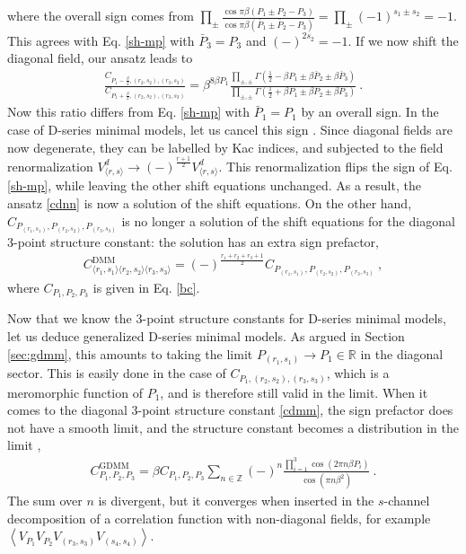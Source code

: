 \documentclass[12pt, a4paper]{article}
\theoremstyle{break}
\begin{document}
where the overall sign comes from $\prod_\pm \frac{\cos \pi\beta(P_1\pm P_2-P_3)}{\cos\pi\beta(\bar P_1\pm \bar P_2-P_3)} = \prod_\pm (-1)^{s_1\pm s_2} = -1$. This agrees with Eq. \eqref{sh-mp} with $\bar P_3=P_3$ and $(-)^{2s_2}=-1$. If we now shift the diagonal field, our ansatz leads to 
\begin{align}
 \frac{C_{P_1-\frac{\beta}{2},(r_2,s_2),(r_3,s_3)}}{C_{P_1+\frac{\beta}{2},(r_2,s_2),(r_3,s_3)}} =\beta^{8\beta P_1}\frac{\prod_{\pm,\pm} \Gamma(\frac12-\beta P_1\pm \beta\bar P_2\pm \beta \bar P_3)}{\prod_{\pm,\pm} \Gamma(\frac12+\beta P_1\pm \beta P_2\pm \beta P_3)}\ .
\end{align}
Now this ratio differs from Eq. \eqref{sh-mp} with $\bar P_1=P_1$ by an overall sign. 
In the case of D-series minimal models, 
let us cancel this sign . Since diagonal fields are now degenerate, they can be labelled by Kac indices, and subjected to the field renormalization 
$V^d_{\langle r,s\rangle}\to (-)^{\frac{r+1}{2}} V^d_{\langle r,s\rangle}$. 
This renormalization flips the sign of Eq. \eqref{sh-mp}, while leaving the other shift equations unchanged. As a result, the ansatz \eqref{cdnn} is now a solution of the shift equations. On the other hand, $C_{P_{(r_1,s_1)},P_{(r_2,s_2)},P_{(r_3,s_3)}}$ is no longer a solution
of the shift equations for the diagonal 3-point structure constant: the solution has an extra sign prefactor,
\begin{align}
 \boxed{C^\text{DMM}_{\langle r_1,s_1\rangle\langle r_2,s_2\rangle\langle r_3,s_3\rangle} = (-)^\frac{r_1+r_2+r_3+1}{2} C_{P_{(r_1,s_1)},P_{(r_2,s_2)},P_{(r_3,s_3)}}}\ , 
 \label{cdmm}
\end{align}
where $C_{P_1,P_2,P_3}$ is given in Eq. \eqref{bc}.

Now that we know the 3-point structure constants for D-series minimal models, let us deduce generalized D-series minimal models. As argued in Section \ref{sec:gdmm}, this amounts to taking the limit $P_{(r_1,s_1)}\to P_1\in\mathbb{R}$ in the diagonal sector. This is easily done in the case of $C_{P_1,(r_2,s_2),(r_3,s_3)}$, which is a meromorphic function of $P_1$, and is therefore still valid in the limit. When it comes to the diagonal 3-point structure constant \eqref{cdmm}, the sign prefactor does not have a smooth limit, and the structure constant becomes a distribution in the limit \cite{rib19},
\begin{align}
 \boxed{C^\text{GDMM}_{P_1,P_2,P_3} = \beta C_{P_1,P_2,P_3}\sum_{n\in\mathbb{Z}}(-)^n \frac{\prod_{i=1}^3 \cos(2\pi n\beta P_i)}{\cos(\pi n\beta^2)}}\ .
 \label{cgdmm}
\end{align}
The sum over $n$ is divergent, but it converges when inserted in the $s$-channel decomposition of a correlation function with non-diagonal fields, for example $\left<V_{P_1}V_{P_2}V_{(r_3,s_3)}V_{(s_4,s_4)}\right>$. 
\end{document}
